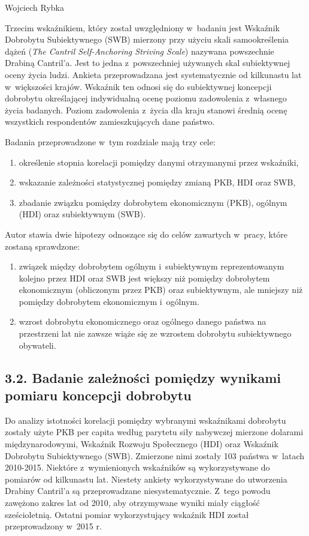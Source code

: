 \begin{artplenv}{Wojciech Rybka}
\enlargethispage{.5\baselineskip}

Trzecim wskaźnikiem, który został uwzględniony w~badaniu jest Wskaźnik Dobrobytu Subiektywnego (SWB) mierzony przy
użyciu skali samookreślenia dążeń (\textit{The Cantril Self-Anchoring Striving Scale}) nazywana powszechnie Drabiną
Cantril’a. Jest to jedna z~powszechniej używanych skal subiektywnej oceny życia ludzi. Ankieta przeprowadzana jest
systematycznie od kilkunastu lat w~większości krajów. Wskaźnik ten odnosi się do subiektywnej koncepcji dobrobytu
określającej indywidualną ocenę poziomu zadowolenia z~własnego życia badanych. Poziom zadowolenia z~życia dla kraju
stanowi średnią ocenę wszystkich respondentów zamieszkujących dane państwo.

Badania przeprowadzone w~tym rozdziale mają trzy cele:

\begin{enumerate}
\item określenie stopnia korelacji pomiędzy danymi otrzymanymi przez wskaźniki,
\item wskazanie zależności statystycznej pomiędzy zmianą PKB, HDI oraz SWB,
\item zbadanie związku pomiędzy dobrobytem ekonomicznym (PKB), ogólnym (HDI) oraz subiektywnym (SWB).
\end{enumerate}
Autor stawia dwie hipotezy odnoszące się do celów zawartych w~pracy, które zostaną sprawdzone:

\begin{enumerate}
\item związek między dobrobytem ogólnym i~subiektywnym reprezentowanym kolejno przez HDI oraz SWB jest większy niż
pomiędzy dobrobytem ekonomicznym (obliczonym przez PKB) oraz subiektywnym, ale mniejszy niż pomiędzy dobrobytem
ekonomicznym i~ogólnym.
\item wzrost dobrobytu ekonomicznego oraz ogólnego danego państwa na przestrzeni lat nie zawsze wiąże się ze wzrostem
dobrobytu subiektywnego obywateli.
\end{enumerate}
\subsection{3.2. Badanie zależności pomiędzy wynikami pomiaru koncepcji dobrobytu}
Do analizy istotności korelacji pomiędzy wybranymi wskaźnikami dobrobytu zostały użyte PKB per capita według parytetu
siły nabywczej mierzone dolarami międzynarodowymi, Wskaźnik Rozwoju Społecznego (HDI) oraz Wskaźnik Dobrobytu
Subiektywnego (SWB). Zmierzone nimi zostały 103 państwa w~latach 2010-2015. Niektóre z~wymienionych wskaźników są
wykorzystywane do pomiarów od kilkunastu lat. Niestety ankiety wykorzystywane do utworzenia Drabiny Cantril’a są
przeprowadzane niesystematycznie. Z~tego powodu zawężono zakres lat od 2010, aby otrzymywane wyniki miały ciągłość
sześcioletnią. Ostatni pomiar wykorzystujący wskaźnik HDI został przeprowadzony w~2015 r. 


\end{artplenv}
